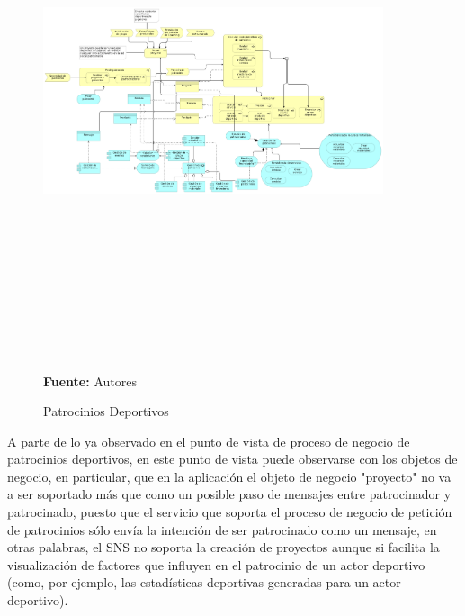 \begin{figure}[!htb]
  \begin{center}
    \includegraphics[angle=90,width=10cm,height=15cm]{./imagenes/Archimate/vistas/application_usage/patrociniosdeportivos.png}
    \caption{Patrocinios Deportivos}
    \label{fig:au_patrocinios_deportivos}
    \textbf{Fuente:}  Autores \\
  \end{center}
\end{figure}

A parte de lo ya observado en el punto de vista de proceso de negocio de patrocinios deportivos, en este punto de vista puede observarse con los objetos de negocio, en particular, que en la aplicación el objeto de negocio "proyecto" no va a ser soportado más que como un posible paso de mensajes entre patrocinador y patrocinado, puesto que el servicio que soporta el proceso de negocio de petición de patrocinios sólo envía la intención de ser patrocinado como un mensaje, en otras palabras, el SNS no soporta la creación de proyectos aunque si facilita la visualización de factores que influyen en el patrocinio de un actor deportivo (como, por ejemplo, las estadísticas deportivas generadas para un actor deportivo).

